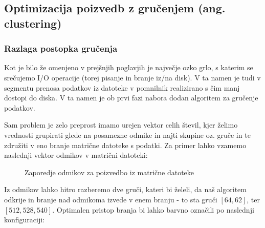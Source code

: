 \documentclass[a4paper,12pt,openright]{book}
\begin{document}
        \subsection{Optimizacija poizvedb z gručenjem (ang. clustering)}
        \subsubsection{Razlaga postopka gručenja}
        
        Kot je bilo že omenjeno v prejšnjih poglavjih je največje ozko grlo, s katerim se srečujemo I/O operacije (torej pisanje in branje iz/na disk). V ta namen je tudi v segmentu prenosa podatkov iz datoteke v pomnilnik realizirano s čim manj dostopi do diska. V ta namen je ob prvi fazi nabora dodan algoritem za gručenje podatkov.

        Sam problem je zelo preprost imamo urejen vektor celih števil, kjer želimo vrednosti grupirati glede na posamezne odmike in najti skupine oz. gruče in te združiti v eno branje matrične datoteke s podatki. Za primer lahko vzamemo naslednji vektor odmikov v matrični datoteki:

\hfill \break
\begin{figure}[h]
\begin{center}
\caption{Zaporedje odmikov za poizvedbo iz matrične datoteke}
\end{center}
\end{figure}

\noindent Iz odmikov lahko hitro razberemo dve gruči, kateri bi želeli, da naš algoritem odkrije in branje nad odmikoma izvede v enem branju - to sta gruči $[64, 62]$, ter $[512, 528, 540]$. Optimalen pristop branja bi lahko barvno označili po naslednji konfiguraciji:
\end{document}
